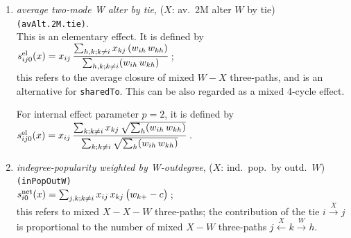 \documentclass[a4paper,fleqn,11pt]{article}
\newcommand{\+}{\, + \,}
\newcommand{\vit}{\theenumi}
\begin{document}
\begin{enumerate}
 This can be regarded as a higher-order effect related to the \texttt{inPopOutW}
 effect (see below) as well as indegree-popularity.
 The differences between the centered and non-centered versions amount to
 a multiple of the indegree-popularity (without $\sqrt{}$) \texttt{inPop} effect.
 Therefore, when the \texttt{sharedTo} effect is used, it may be advisable
 also to include the \texttt{inPop}, \texttt{outActIntn}, and
 \texttt{inPopOutW} effects, so as to avoid misinterpretations.

 \item
 {\em average two-mode W alter by tie}, ($X$: av.\ 2M alter $W$ by tie)
        \texttt{(avAlt.2M.tie)}. \\[0.2em]
 This is an elementary effect.  It is defined by \\[0.4em]
 $s^{\rm el}_{ij\vit}(x) =  \displaystyle x_{ij}\, \frac{\sum_{h,k; k \neq i} x_{kj}\,
                  ( w_{ih}\, w_{kh} ) } {\sum_{h,k; k \neq i} ( w_{ih}\, w_{kh} ) } \,$;\\[0.2em]
 this refers to the average closure of mixed $W-X$ three-paths, and is an alternative for \texttt{sharedTo}.
 This can be also regarded as a mixed 4-cycle effect.

 For internal effect parameter $p=2$, it is defined by\\[0.4em]
 $s^{\rm el}_{ij\vit}(x) =  \displaystyle x_{ij}\, \frac{\sum_{k; k \neq i}  x_{kj}\, \sqrt{ \sum_h
                  ( w_{ih}\, w_{kh} ) }}
                   {\sum_{k; k \neq i} \sqrt{ \sum_h ( w_{ih}\, w_{kh} ) }} \,$.\\[0.2em]

 \item
\begin{minipage}[t]{.6\textwidth}
 {\em indegree-popularity weighted by W-outdegree},
 ($X$: ind.\ pop.\ by outd.\ $W$) \texttt{(inPopOutW)} \\[0.2em]
 $s^{\rm net}_{i\vit}(x) = \sum_{j,k; k \neq i} x_{ij}\, x_{kj}\,
                  \big(  w_{k+} - c\big ) \,$;\\[0.2em]
 this refers to  mixed $X-X-W$ three-paths;
 the contribution of the tie $i \stackrel{X}{\rightarrow} j$
 is proportional to
 the number of mixed $X-W$ three-paths
 $ j  \stackrel{X}{\leftarrow} k  \stackrel{W}{\rightarrow} h$.


\end{minipage}
\end{enumerate}
\end{document}
